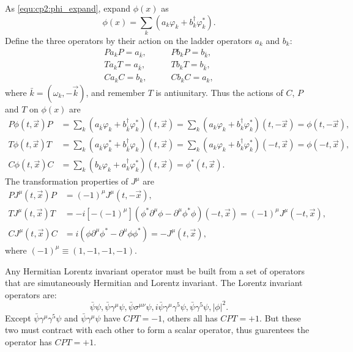 \begin{problembody}
    \item As \eqref{equ:cp2:phi_expand}, expand $\phi(x)$ as
    \[
        \phi(x) = \sum_k \left(a_k\varphi_k + b_k^\dagger\varphi_k^\ast\right).    
    \]
    Define the three operators by their action on the ladder operators $a_k$ and $b_k$:
    \begin{align*}
        P a_k P = a_{\bar{k}}, &\qquad P b_k P = b_{\bar{k}},\\
        T a_k T = a_{\bar{k}}, &\qquad T b_k T = b_{\bar{k}},\\
        C a_k C = b_k, &\qquad C b_k C = a_k,
    \end{align*}
    where $\bar{k} = (\omega_k, -\vec{k})$, and remember $T$ is antiunitary. Thus the actions of
    $C$, $P$ and $T$ on $\phi(x)$ are
    \begin{align*}
        P\phi(t, \vec{x})P & = \sum_k \left(
            a_{\bar{k}}\varphi_k + b_{\bar{k}}^\dagger\varphi_k^\ast    
        \right)(t, \vec{x})
        = \sum_k \left(
            a_k\varphi_k + b_k^\dagger\varphi_k^\ast
        \right)(t, -\vec{x}) = \phi(t, -\vec{x}),\\
        T \phi(t, \vec{x}) T & = \sum_k \left(
            a_{\bar{k}}\varphi_k^\ast + b_{\bar{k}}^\dagger\varphi_k
        \right)(t, \vec{x}) = \sum_k\left(
            a_k\varphi_k + b_k^\dagger\varphi_k^\ast
        \right)(-t, \vec{x}) = \phi(-t, \vec{x}),\\
        C \phi(t, \vec{x}) C & = \sum_k \left(
            b_k\varphi_k + a_k^\dagger\varphi_k^\ast
        \right)(t, \vec{x}) = \phi^\ast(t, \vec{x}).
    \end{align*}
    The transformation properties of $J^\mu$ are
    \begin{align*}
        P J^\mu(t, \vec{x}) P & = (-1)^\mu J^\mu(t, -\vec{x}),\\
        T J^\mu(t, \vec{x}) T & 
        = -i[-(-1)^\mu] (\phi^\ast\partial^\mu\phi - \partial^\mu\phi^\ast\phi)(-t, \vec{x})
        = (-1)^\mu J^\mu(-t, \vec{x}),\\
        C J^\mu(t, \vec{x}) C & 
        = i(\phi\partial^\mu\phi^\ast - \partial^\mu\phi\phi^\ast)
        = -J^\mu(t, \vec{x}),
    \end{align*}
    where $(-1)^\mu \equiv (1, -1, -1, -1)$.

    \item Any Hermitian Lorentz invariant operator must be built from a set of operators that are
    simutaneously Hermitian and Lorentz invariant. The Lorentz invariant operators are:
    \begin{equation*}
        \bar{\psi}\psi, \bar{\psi}\gamma^\mu\psi, \bar{\psi}\sigma^{\mu\nu}\psi,
        i\bar{\psi}\gamma^\mu\gamma^5\psi, \bar{\psi}\gamma^5\psi, |\phi|^2.
    \end{equation*}
    Except $\bar{\psi}\gamma^\mu\gamma^5\psi$ and $\bar{\psi}\gamma^\mu\psi$ have $CPT = -1$, others all has $CPT = +1$. But these two 
    must contract with each other to form a scalar operator, thus guarentees the operator has $CPT = +1$.
\end{problembody}

